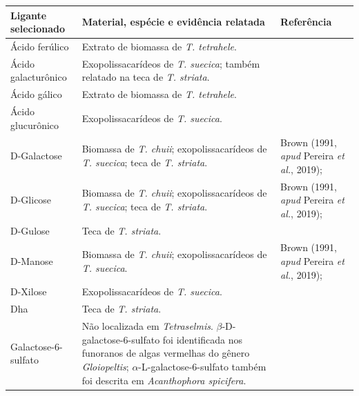 \begin{table}[H]
\centering
\footnotesize
\setlength{\tabcolsep}{3pt}
\renewcommand{\arraystretch}{1.08}
\label{quad:ligantes_spe_literatura}
\vspace{3pt}
\begin{tabular}{|C{3.0cm}|C{8.2cm}|C{4.0cm}|}
\hline
\textbf{Ligante selecionado} & \textbf{Material, espécie e evidência relatada} & \textbf{Referência} \\
\hline
Ácido ferúlico & Extrato de biomassa de \textit{T. tetrahele}. & \textcite{mai2026} \\
\hline
Ácido galacturônico & Exopolissacarídeos de \textit{T. suecica}; também relatado na teca de \textit{T. striata}. & \textcite{parra2020,becker1989} \\
\hline
Ácido gálico & Extrato de biomassa de \textit{T. tetrahele}. & \textcite{mai2026} \\
\hline
Ácido glucurônico & Exopolissacarídeos de \textit{T. suecica}. & \textcite{parra2020} \\
\hline
D-Galactose & Biomassa de \textit{T. chuii}; exopolissacarídeos de \textit{T. suecica}; teca de \textit{T. striata}. & Brown (1991, \textit{apud} Pereira \textit{et al.}, 2019); \textcite{parra2020,becker1989} \\
\hline
D-Glicose & Biomassa de \textit{T. chuii}; exopolissacarídeos de \textit{T. suecica}; teca de \textit{T. striata}. & Brown (1991, \textit{apud} Pereira \textit{et al.}, 2019); \textcite{parra2020,becker1989} \\
\hline
D-Gulose & Teca de \textit{T. striata}. & \textcite{becker1989} \\
\hline
D-Manose & Biomassa de \textit{T. chuii}; exopolissacarídeos de \textit{T. suecica}. & Brown (1991, \textit{apud} Pereira \textit{et al.}, 2019); \textcite{parra2020} \\
\hline
D-Xilose & Exopolissacarídeos de \textit{T. suecica}. & \textcite{parra2020} \\
\hline
Dha & Teca de \textit{T. striata}. & \textcite{becker1989} \\
\hline
Galactose-6-sulfato & Não localizada em \textit{Tetraselmis}. $\beta$-D-galactose-6-sulfato foi identificada nos funoranos de algas vermelhas do gênero \textit{Gloiopeltis}; $\alpha$-L-galactose-6-sulfato também foi descrita em \textit{Acanthophora spicifera}. & \textcite{tuvikene2015funorans,duarte2004} \\

\end{tabular}
\end{table}
